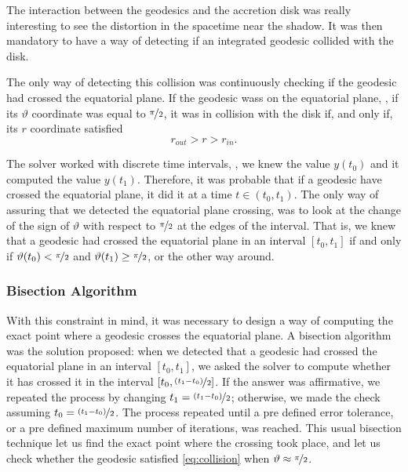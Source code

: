 The interaction between the geodesics and the accretion disk was really interesting to see the distortion in the spacetime near the shadow. It was then mandatory to have a way of detecting if an integrated geodesic collided with the disk.

The only way of detecting this collision was continuously checking if the geodesic had crossed the equatorial plane. If the geodesic wass on the equatorial plane, \ie, if its $\vartheta$ coordinate was equal to $\nicefrac{\pi}{2}$, it was in collision with the disk if, and only if, its $r$ coordinate satisfied
\begin{equation}
\label{eq:collision}
r_{out} > r > r_{in}.
\end{equation}

The solver worked with discrete time intervals, \ie, we knew the value $y(t_0)$ and it computed the value $y(t_1)$. Therefore, it was probable that if a geodesic have crossed the equatorial plane, it did it at a time $t \in (t_0, t_1)$. The only way of assuring that we detected the equatorial plane crossing, was to look at the change of the sign of $\vartheta$ with respect to $\nicefrac{\pi}{2}$ at the edges of the interval. That is, we knew that a geodesic had crossed the equatorial plane in an interval $[t_0, t_1]$ if and only if $\vartheta(t_0) < \nicefrac{\pi}{2}$ and $\vartheta(t_1) \geq \nicefrac{\pi}{2}$, or the other way around.

\subsubsection*{Bisection Algorithm}

With this constraint in mind, it was necessary to design a way of computing the exact point where a geodesic crosses the equatorial plane. A bisection algorithm was the solution proposed: when we detected that a geodesic had crossed the equatorial plane in an interval $[t_0, t_1]$, we asked the solver to compute whether it has crossed it in the interval $[t_0, \nicefrac{(t_1 - t_0)}{2}]$. If the answer was affirmative, we repeated the process by changing $t_1 = \nicefrac{(t_1 - t_0)}{2}$; otherwise, we made the check assuming $t_0 = \nicefrac{(t_1 - t_0)}{2}$. The process repeated until a pre defined error tolerance, or a pre defined maximum number of iterations, was reached. This usual bisection technique let us find the exact point where the crossing took place, and let us check whether the geodesic satisfied \autoref{eq:collision} when $\vartheta \approx \nicefrac{\pi}{2}$.


